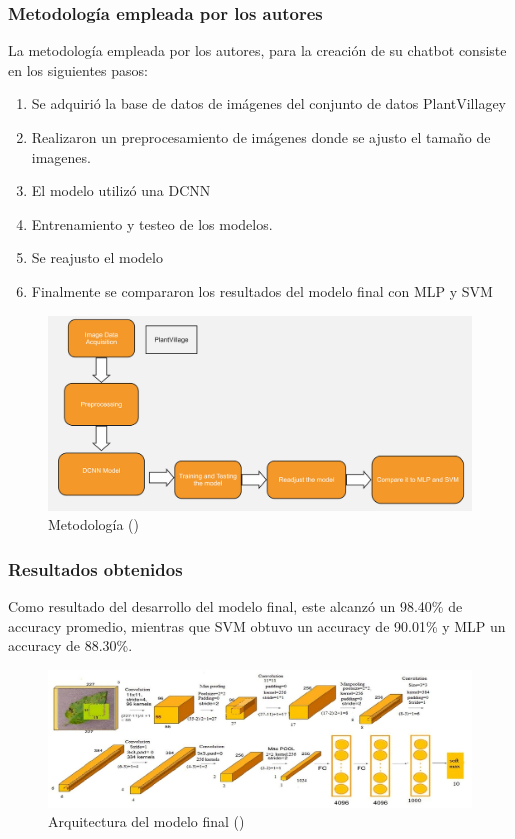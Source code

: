 \subsubsection{Metodología empleada por los autores}
La metodología empleada por los autores, para la creación de su chatbot consiste en los siguientes pasos: 
 \begin{enumerate}
	\item Se adquirió la base de datos de imágenes del conjunto de datos PlantVillagey
	\item Realizaron un preprocesamiento de imágenes donde se ajusto el tamaño de imagenes.
	\item El modelo utilizó una DCNN
	\item Entrenamiento y testeo de los modelos.
	\item Se reajusto el modelo
	\item Finalmente se compararon los resultados del modelo final con MLP y SVM
\end{enumerate}
\begin{figure}[H]
	\begin{center}
		\includegraphics[width=1\textwidth]{2/figures/ant5.jpg}
		\caption{Metodología (\cite{antecedente5})}
	\end{center}
\end{figure}

\subsubsection{Resultados obtenidos}
Como resultado del desarrollo del modelo final, este alcanzó un 98.40\% de accuracy promedio, mientras que SVM obtuvo un accuracy de 90.01\% y MLP un accuracy de 88.30\%. 

\begin{figure}[H]
	\begin{center}
		\includegraphics[width=1\textwidth]{2/figures/ant5.2.jpeg}
		\caption{Arquitectura del modelo final (\cite{antecedente5})}
	\end{center}
\end{figure}

